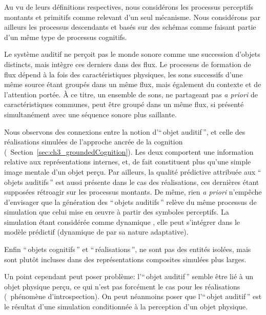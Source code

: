 Au vu de leurs définitions respectives, nous considérons les processus perceptifs montants et primitifs comme relevant d'un seul mécanisme. Nous considérons par ailleurs les processus descendants et basés sur des schémas comme faisant partie d'un même type de processus cognitifs.

Le système auditif ne perçoit pas le monde sonore comme une succession d'objets distincts, mais intègre ces derniers dans des flux. Le processus de formation de flux dépend à la fois des caractéristiques physiques, les sons successifs d'une même source étant groupés dans un même flux, mais également du contexte et de l'attention portée. À ce titre, un ensemble de sons, ne partageant pas \emph{a priori} de caractéristiques communes, peut être groupé dans un même flux, si présenté simultanément avec une séquence sonore plus saillante.

Nous observons des connexions entre la notion d'``\,objet auditif\,'', et celle des réalisations simulées de l'approche ancrée de la cognition (\cf~Section~\ref{sec:ch3_groundedCognition}). Les deux comportent une information relative aux représentations internes, et, de fait constituent plus qu'une simple image mentale d'un objet perçu. Par ailleurs, la qualité prédictive attribuée aux ``\,objets auditifs\,'' est aussi présente dans le cas des réalisations, ces dernières étant supposées rétroagir sur les processus montants. De même, rien \emph{a priori} n'empêche d'envisager que la génération des ``\,objets auditifs\,'' relève du même processus de simulation que celui mise en œuvre à partir des symboles perceptifs. La simulation étant considérée comme dynamique \citep{barsalou1999perceptions}, elle peut s'intégrer dans le modèle prédictif (dynamique de par sa nature adaptative).

Enfin ``\,objets cognitifs\,'' et ``\,réalisations\,'', ne sont pas des entités isolées, mais sont plutôt incluses dans des représentations composites simulées plus larges.

Un point cependant peut poser problème: l'``\,objet auditif\,'' semble être lié à un objet physique perçu, ce qui n'est pas forcément le cas pour les réalisations (\eg~phénomène d'introspection). On peut néanmoins poser que l'``\,objet auditif\,'' est le résultat d'une simulation conditionnée à la perception d'un objet physique.

